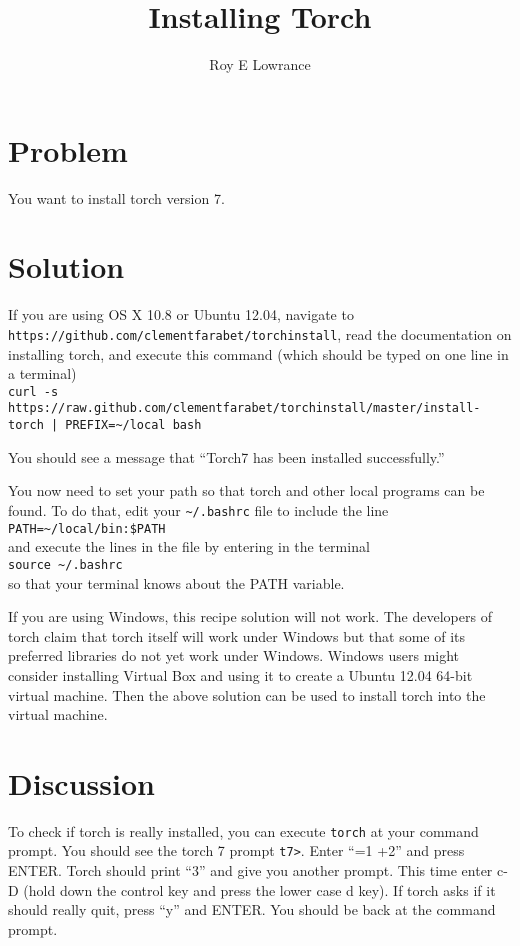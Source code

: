\documentclass{article}
\let\code\texttt %
\begin{document}
\title{Installing Torch}
\author{Roy E Lowrance}
\maketitle


\section{Problem}
You want to install torch version 7.

\section{Solution}
If you are using OS X 10.8 or Ubuntu 12.04, navigate to\\
\code{https://github.com/clementfarabet/torchinstall}, read the
documentation on installing torch, and execute this command (which
should be typed on one line in a terminal)\\
\code{curl -s
  https://raw.github.com/clementfarabet/torchinstall/master/install-torch
| PREFIX=\textasciitilde/local bash}

You should see a message that ``Torch7 has been installed
successfully.''

You now need to set your path so that torch and other local programs can
be found. To do that, edit your \code{\textasciitilde/.bashrc} file to
include the line\\
\code{PATH=\textasciitilde/local/bin:\$PATH}\\
and execute the lines in the file by entering in the terminal\\
\code{source \textasciitilde/.bashrc}\\
so that your terminal knows about the PATH variable.

If you are using Windows, this recipe solution will not work. The
developers of torch claim that torch itself will work under Windows but
that some of its preferred libraries do not yet work under Windows.
Windows users might consider installing Virtual Box and using it to
create a Ubuntu 12.04 64-bit virtual machine. Then the above solution
can be used to install torch into the virtual machine.

\section{Discussion}

To check if torch is really installed, you can execute \code{torch}
 at your command prompt. You
should see the torch 7 prompt \code{t7>}. Enter ``=1 +2'' and press
ENTER. Torch should print ``3'' and give you another prompt. This time
enter c-D (hold down the control key and press the lower case d key). If
torch asks if it should really quit, press ``y'' and ENTER. You should
be back at the command prompt.
\end{document}
